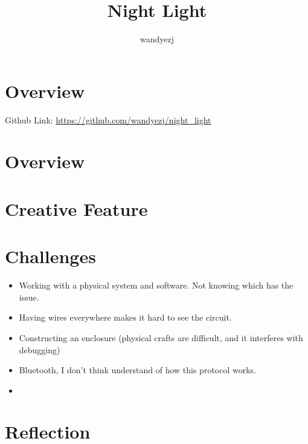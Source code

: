 \documentclass{article}
\title{Night Light}
\author{wandyezj}
\begin{document}
	\maketitle
	\tableofcontents
	
	
	
	\clearpage
	
	\section{Overview}
	
	Github Link: \href{https://github.com/wandyezj/night_light}{https://github.com/wandyezj/night\_light}
	\newline

	\clearpage
	\section{Overview}
	
	\clearpage
	\section{Creative Feature}
	
	\clearpage
	\section{Challenges}
	
	\begin{itemize}
		\item Working with a physical system and software. Not knowing which has the issue.
		\item Having wires everywhere makes it hard to see the circuit.
		\item Constructing an enclosure (physical crafts are difficult, and it interferes with debugging)
		\item Bluetooth, I don't think understand of how this protocol works.
		\item 
	\end{itemize}
	
	\section{Reflection}
		
\end{document}
